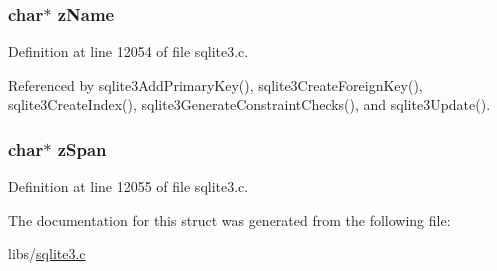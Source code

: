 \subsubsection[{z\+Name}]{\setlength{\rightskip}{0pt plus 5cm}char$\ast$ z\+Name}\label{struct_expr_list_1_1_expr_list__item_a661118d86ac4127d40bf3be78d92117d}


Definition at line 12054 of file sqlite3.\+c.



Referenced by sqlite3\+Add\+Primary\+Key(), sqlite3\+Create\+Foreign\+Key(), sqlite3\+Create\+Index(), sqlite3\+Generate\+Constraint\+Checks(), and sqlite3\+Update().

\hypertarget{struct_expr_list_1_1_expr_list__item_a16b42da8bcc375198f6e1942d1cfbfac}{}
\subsubsection[{z\+Span}]{\setlength{\rightskip}{0pt plus 5cm}char$\ast$ z\+Span}\label{struct_expr_list_1_1_expr_list__item_a16b42da8bcc375198f6e1942d1cfbfac}


Definition at line 12055 of file sqlite3.\+c.



The documentation for this struct was generated from the following file\+:\begin{DoxyCompactItemize}
\item 
libs/\hyperlink{sqlite3_8c}{sqlite3.\+c}\end{DoxyCompactItemize}
